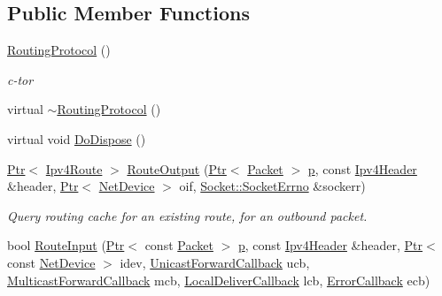 \subsection*{Public Member Functions}
\begin{DoxyCompactItemize}
\item 
\hyperlink{classns3_1_1aodv_1_1RoutingProtocol_ad27c1423db534d49ebbd616b189567ae}{Routing\+Protocol} ()
\begin{DoxyCompactList}\small\item\em c-\/tor \end{DoxyCompactList}\item 
virtual \hyperlink{classns3_1_1aodv_1_1RoutingProtocol_a27bb582738ca2a7c82ed620b598f0d4c}{$\sim$\+Routing\+Protocol} ()
\item 
virtual void \hyperlink{classns3_1_1aodv_1_1RoutingProtocol_a338ef59a9193b074021d2ae41cd46c07}{Do\+Dispose} ()
\item 
\hyperlink{classns3_1_1Ptr}{Ptr}$<$ \hyperlink{classns3_1_1Ipv4Route}{Ipv4\+Route} $>$ \hyperlink{classns3_1_1aodv_1_1RoutingProtocol_a71210f21868d71657400f6e616153c83}{Route\+Output} (\hyperlink{classns3_1_1Ptr}{Ptr}$<$ \hyperlink{classns3_1_1Packet}{Packet} $>$ \hyperlink{lte__link__budget__x2__handover__measures_8m_ac9de518908a968428863f829398a4e62}{p}, const \hyperlink{classns3_1_1Ipv4Header}{Ipv4\+Header} \&header, \hyperlink{classns3_1_1Ptr}{Ptr}$<$ \hyperlink{classns3_1_1NetDevice}{Net\+Device} $>$ oif, \hyperlink{classns3_1_1Socket_ada1328c5ae0c28cb2a982caf8f6d6cca}{Socket\+::\+Socket\+Errno} \&sockerr)
\begin{DoxyCompactList}\small\item\em Query routing cache for an existing route, for an outbound packet. \end{DoxyCompactList}\item 
bool \hyperlink{classns3_1_1aodv_1_1RoutingProtocol_a2190605f405bf68aef54630652988163}{Route\+Input} (\hyperlink{classns3_1_1Ptr}{Ptr}$<$ const \hyperlink{classns3_1_1Packet}{Packet} $>$ \hyperlink{lte__link__budget__x2__handover__measures_8m_ac9de518908a968428863f829398a4e62}{p}, const \hyperlink{classns3_1_1Ipv4Header}{Ipv4\+Header} \&header, \hyperlink{classns3_1_1Ptr}{Ptr}$<$ const \hyperlink{classns3_1_1NetDevice}{Net\+Device} $>$ idev, \hyperlink{classns3_1_1Ipv4RoutingProtocol_a3453a85764cbbb1e704da7e919aa5d19}{Unicast\+Forward\+Callback} ucb, \hyperlink{classns3_1_1Ipv4RoutingProtocol_a26e76f7a555462e6c08fceda64a99d58}{Multicast\+Forward\+Callback} mcb, \hyperlink{classns3_1_1Ipv4RoutingProtocol_aa6ffa0159cb143daa3c46d2ba69bb1b9}{Local\+Deliver\+Callback} lcb, \hyperlink{classns3_1_1Ipv4RoutingProtocol_a0348285418c30d5021b08f7a68af21ea}{Error\+Callback} ecb)

\end{DoxyCompactItemize}
